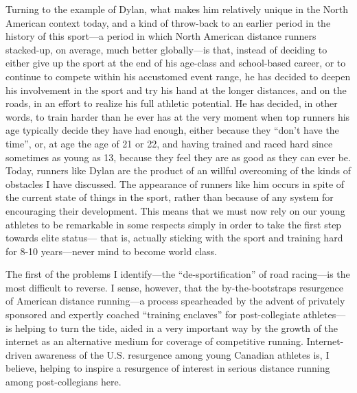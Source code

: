 Turning to the example of Dylan, what makes him relatively unique in the North American context today, and a kind of throw-back to an earlier period in the history of this sport—a period in which North American distance runners stacked-up, on average, much better globally—is that, instead of deciding to either give up the sport at the end of his age-class and school-based career, or to continue to compete within his accustomed event range, he has decided to deepen his involvement in the sport and try his hand at the longer distances, and on the roads, in an effort to realize his full athletic potential. He has decided, in other words, to train harder than he ever has at the very moment when top runners his age typically decide they have had enough, either because they “don’t have the time”, or, at age the age of 21 or 22, and having trained and raced hard since sometimes as young as 13, because they feel they are as good as they can ever be. Today, runners like Dylan are the product of an willful overcoming of the kinds of obstacles I have discussed. The appearance of runners like him occurs in spite of the current state of things in the sport, rather than because of any system for encouraging their development. This means that we must now rely on our young athletes to be remarkable in some respects simply in order to take the first step towards elite status— that is, actually sticking with the sport and training hard for 8-10 years—never mind to become world class.

The first of the problems I identify—the “de-sportification” of road racing—is the most difficult to reverse. I sense, however, that the by-the-bootstraps resurgence of American distance running—a process spearheaded by the advent of privately sponsored and expertly coached “training enclaves” for post-collegiate athletes—is helping to turn the tide, aided in a very important way by the growth of the internet as an alternative medium for coverage of competitive running. Internet-driven awareness of the U.S. resurgence among young Canadian athletes is, I believe, helping to inspire a resurgence of interest in serious distance running among post-collegians here.

